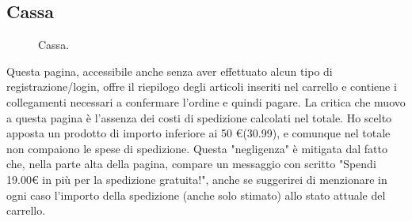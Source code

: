 \subsection{Cassa}
\begin{figure}[!htb]
	\caption{\label{fig:figura11}} Cassa.
\end{figure}
Questa pagina, accessibile anche senza aver effettuato alcun tipo di registrazione/login, offre il riepilogo degli articoli inseriti nel carrello e contiene i collegamenti necessari a confermare l'ordine e quindi pagare. La critica che muovo a questa pagina è l'assenza dei costi di spedizione calcolati nel totale. Ho scelto apposta un prodotto di importo inferiore ai 50 \euro (30.99), e comunque nel totale non compaiono le spese di spedizione. Questa "negligenza" è mitigata dal fatto che, nella parte alta della pagina, compare un messaggio con scritto "Spendi 19.00\euro \! in più per la spedizione gratuita!", anche se suggerirei di menzionare in ogni caso l'importo della spedizione (anche solo stimato) allo stato attuale del carrello.

\pagebreak
